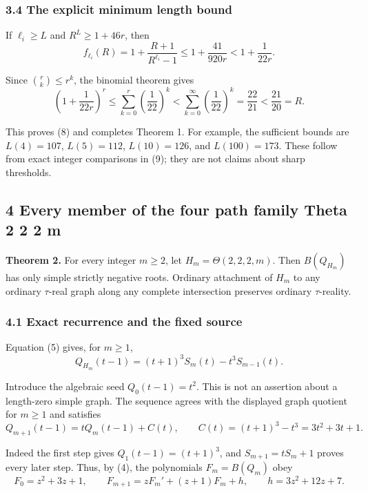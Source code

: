 \documentclass[
  11pt,
  a4paper,
]{article}
\begin{document}
\subsubsection{3.4 The explicit minimum length
bound}\label{the-explicit-minimum-length-bound}

If \(\ell_i\geq L\) and \(R^L\geq1+46r\), then
\nopagebreak
\[
f_{\ell_i}(R)=1+\frac{R+1}{R^{\ell_i}-1}
\leq1+\frac{41}{920r}<1+\frac{1}{22r}.
\]

Since \(\binom rk\leq r^k\), the binomial theorem gives
\nopagebreak
\[
\left(1+\frac{1}{22r}\right)^r
\leq\sum_{k=0}^r\left(\frac1{22}\right)^k
<\sum_{k=0}^\infty\left(\frac1{22}\right)^k
=\frac{22}{21}<\frac{21}{20}=R.
\]

This proves (8) and completes Theorem 1. For example, the sufficient
bounds are \(L(4)=107\), \(L(5)=112\), \(L(10)=126\), and
\(L(100)=173\). These follow from exact integer comparisons in (9); they
are not claims about sharp thresholds.

\subsection{4 Every member of the four path family Theta 2 2 2
m}\label{every-member-of-the-four-path-family-theta-2-2-2-m}

\textbf{Theorem 2.} For every integer \(m\geq2\), let
\(H_m=\Theta(2,2,2,m)\). Then \(B(Q_{H_m})\) has only simple strictly
negative roots. Ordinary attachment of \(H_m\) to any ordinary
\(\tau\)-real graph along any complete intersection preserves ordinary
\(\tau\)-reality.

\subsubsection{4.1 Exact recurrence and the fixed
source}\label{exact-recurrence-and-the-fixed-source}

Equation (5) gives, for \(m\geq1\),
\nopagebreak
\[
Q_{H_m}(t-1)=(t+1)^3S_m(t)-t^3S_{m-1}(t).
\]

Introduce the algebraic seed \(Q_0(t-1)=t^2\). This is not an assertion
about a length-zero simple graph. The sequence agrees with the displayed
graph quotient for \(m\geq1\) and satisfies
\nopagebreak
\[
Q_{m+1}(t-1)=tQ_m(t-1)+C(t),\qquad
C(t)=(t+1)^3-t^3=3t^2+3t+1.\tag{19}
\]

Indeed the first step gives \(Q_1(t-1)=(t+1)^3\), and \(S_{m+1}=tS_m+1\)
proves every later step. Thus, by (4), the polynomials \(F_m=B(Q_m)\)
obey
\nopagebreak
\[
F_0=z^2+3z+1,\qquad
F_{m+1}=zF_m'+(z+1)F_m+h,\qquad
h=3z^2+12z+7.\tag{20}
\]
\end{document}

